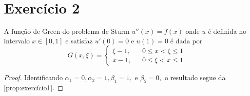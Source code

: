 \section*{Exercício 2}
\begin{corollary}\label{exercício2a}
    A função de Green do problema de Sturm \(u''(x) = f(x)\) onde \(u\) é definida no intervalo \(x \in [0,1]\) e satisfaz \(u'(0) = 0\) e \(u(1) = 0\) é dada por
    \begin{equation*}
        G(x,\xi) = \left\{\begin{aligned}
                \xi - 1, && 0 \leq x < \xi \leq 1\\
                x - 1, && 0 \leq \xi < x \leq 1
        \end{aligned}\right.
    \end{equation*}
\end{corollary}
\begin{proof}
    Identificando \(\alpha_1 = 0, \alpha_2 = 1, \beta_1 = 1,\) e \(\beta_2 = 0,\) o resultado segue da \cref{prop:exercício1}.
\end{proof}

